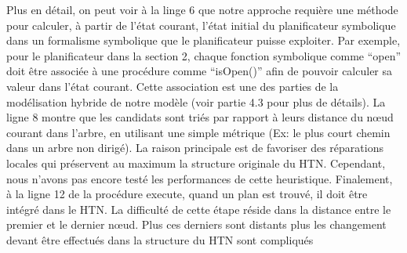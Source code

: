 \documentclass[a4paper,twoside,french]{article}
\begin{document}
			\par Plus en détail, on peut voir à la linge 6 que notre approche requière une méthode pour calculer,  à partir de l'état courant, l'état initial du planificateur symbolique dans un  formalisme symbolique que le planificateur puisse exploiter. Par exemple, pour le planificateur dans la section 2, chaque fonction symbolique comme ``open'' doit être associée à une procédure comme ``isOpen()'' afin de pouvoir calculer sa valeur dans l'état courant. Cette association est une des parties de la modélisation hybride de notre modèle (voir partie 4.3 pour plus de détails). La ligne 8 montre que les candidats sont triés par rapport à leurs distance du nœud courant dans l'arbre, en utilisant une simple métrique (Ex: le plus court chemin dans un arbre non dirigé). La raison principale est de favoriser des réparations locales qui  préservent au maximum  la structure originale du HTN. Cependant, nous n'avons pas encore testé les performances de cette heuristique. 
			Finalement, à la ligne 12 de la procédure {\sc execute}, quand un plan est trouvé, il doit être intégré dans le HTN. La difficulté de cette étape réside dans la distance entre le premier et le dernier nœud. Plus ces derniers sont distants plus les changement  devant être effectués dans la structure du HTN sont compliqués 
\end{document}
